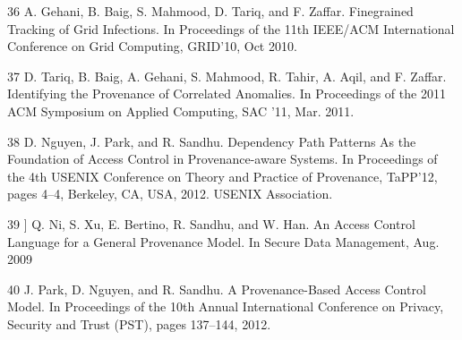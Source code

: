 \documentclass{IEEEtran}
\begin{document}
\begin{thebibliography}{00}
36 A. Gehani, B. Baig, S. Mahmood, D. Tariq, and F. Zaffar. Finegrained Tracking of Grid Infections. In Proceedings of the
11th IEEE/ACM International Conference on Grid Computing,
GRID’10, Oct 2010.

37 D. Tariq, B. Baig, A. Gehani, S. Mahmood, R. Tahir, A. Aqil, and
F. Zaffar. Identifying the Provenance of Correlated Anomalies. In
Proceedings of the 2011 ACM Symposium on Applied Computing,
SAC ’11, Mar. 2011.

38 D. Nguyen, J. Park, and R. Sandhu. Dependency Path Patterns
As the Foundation of Access Control in Provenance-aware Systems. In Proceedings of the 4th USENIX Conference on Theory
and Practice of Provenance, TaPP’12, pages 4–4, Berkeley, CA,
USA, 2012. USENIX Association.

39 ] Q. Ni, S. Xu, E. Bertino, R. Sandhu, and W. Han. An Access
Control Language for a General Provenance Model. In Secure
Data Management, Aug. 2009

40 J. Park, D. Nguyen, and R. Sandhu. A Provenance-Based Access
Control Model. In Proceedings of the 10th Annual International
Conference on Privacy, Security and Trust (PST), pages 137–144,
2012.
\end{thebibliography}
\end{document}

